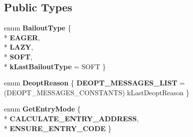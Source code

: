 \subsection*{Public Types}
\begin{DoxyCompactItemize}
\item 
enum {\bfseries Bailout\+Type} \{ \\*
{\bfseries E\+A\+G\+ER}, 
\\*
{\bfseries L\+A\+ZY}, 
\\*
{\bfseries S\+O\+FT}, 
\\*
{\bfseries k\+Last\+Bailout\+Type} = S\+O\+FT
 \}\hypertarget{classv8_1_1internal_1_1_deoptimizer_a25e154e5dc24b78aa0bd15b207eb3be7}{}\label{classv8_1_1internal_1_1_deoptimizer_a25e154e5dc24b78aa0bd15b207eb3be7}

\item 
enum {\bfseries Deopt\+Reason} \{ {\bfseries D\+E\+O\+P\+T\+\_\+\+M\+E\+S\+S\+A\+G\+E\+S\+\_\+\+L\+I\+ST} =(D\+E\+O\+P\+T\+\_\+\+M\+E\+S\+S\+A\+G\+E\+S\+\_\+\+C\+O\+N\+S\+T\+A\+N\+TS) k\+Last\+Deopt\+Reason
 \}\hypertarget{classv8_1_1internal_1_1_deoptimizer_aee0e257b8f9ed3f7144d913219435eb9}{}\label{classv8_1_1internal_1_1_deoptimizer_aee0e257b8f9ed3f7144d913219435eb9}

\item 
enum {\bfseries Get\+Entry\+Mode} \{ \\*
{\bfseries C\+A\+L\+C\+U\+L\+A\+T\+E\+\_\+\+E\+N\+T\+R\+Y\+\_\+\+A\+D\+D\+R\+E\+SS}, 
\\*
{\bfseries E\+N\+S\+U\+R\+E\+\_\+\+E\+N\+T\+R\+Y\+\_\+\+C\+O\+DE}
 \}\hypertarget{classv8_1_1internal_1_1_deoptimizer_a63a30dbded23ad47438ed06d9d7eb3ac}{}\label{classv8_1_1internal_1_1_deoptimizer_a63a30dbded23ad47438ed06d9d7eb3ac}

\end{DoxyCompactItemize}
